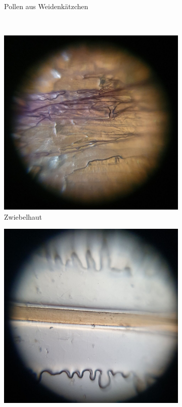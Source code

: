 \begin{figure}[H]
\begin{subfigure}[b]{0.3\textwidth}
				\caption{Pollen aus Weidenkätzchen}
				\label{fig:pollen-w}
			\end{subfigure}
			\\[7pt]
			\begin{subfigure}[b]{0.3\textwidth}
				\includegraphics[width=\textwidth]{images/tv2/probe_zwiebel.jpg}
				\caption{Zwiebelhaut}
				\label{fig:onion}
			\end{subfigure}
			\hspace{5pt}
			\begin{subfigure}[b]{0.3\textwidth}
				\includegraphics[width=\textwidth]{images/tv2/probe_Haar_Marlene.jpg}

\end{subfigure}
\end{figure}
